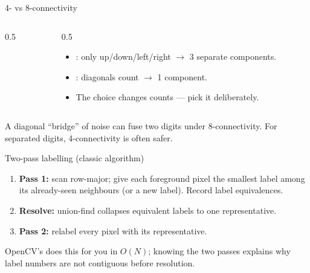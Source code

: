\documentclass[10pt,aspectratio=169]{beamer}
\begin{document}
\begin{frame}{4- vs 8-connectivity}
  \begin{columns}[T]
    \begin{column}{0.5\textwidth}
      \begin{center}
      \end{center}
    \end{column}
    \begin{column}{0.5\textwidth}
      \begin{itemize}
        \item {}: only up/down/left/right $\to$ 3 separate components.
        \item {}: diagonals count $\to$ 1 component.
        \item The choice changes counts --- pick it deliberately.
      \end{itemize}
    \end{column}
  \end{columns}
  \begin{badbox}
    A diagonal ``bridge'' of noise can fuse two digits under 8-connectivity. For separated
    digits, 4-connectivity is often safer.
  \end{badbox}
\end{frame}

\begin{frame}{Two-pass labelling (classic algorithm)}
  \begin{enumerate}
    \item \textbf{Pass 1:} scan row-major; give each foreground pixel the smallest label
          among its already-seen neighbours (or a new label). Record label equivalences.
    \item \textbf{Resolve:} union-find collapses equivalent labels to one representative.
    \item \textbf{Pass 2:} relabel every pixel with its representative.
  \end{enumerate}
  \begin{infobox}
    OpenCV's  does this for you in $O(N)$; knowing the two
    passes explains why label numbers are not contiguous before resolution.
  \end{infobox}
\end{frame}
\end{document}
